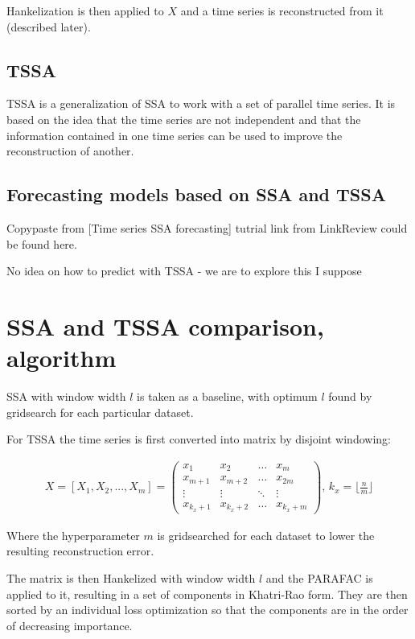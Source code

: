 \documentclass{article}
\begin{document}
Hankelization is then applied to \(X\) and a time series is reconstructed from it (described later).

\subsection{TSSA}

TSSA is a generalization of SSA to work with a set of parallel time series. It is based on the idea that the time series are not independent and that the information contained in one time series can be used to improve the reconstruction of another.

\subsection{Forecasting models based on SSA and TSSA}

Copypaste from [Time series SSA forecasting] tutrial link from LinkReview could be found here.

No idea on how to predict with TSSA - we are to explore this I suppose

\section{SSA and TSSA comparison, algorithm}

SSA with window width \(l\) is taken as a baseline, with optimum \(l\) found by gridsearch for each particular dataset.

For TSSA the time series is first converted into matrix by disjoint windowing:

\begin{gather}
X = [X_1, X_2, ..., X_{m}] =
 \begin{pmatrix}
	x_{1} & x_{2} & \dots & x_{m} \\
	x_{m+1} & x_{m+2} & \dots & x_{2m} \\
	\vdots & \vdots & \ddots & \vdots \\
	x_{k_{x}+1} & x_{k_x + 2} &  \dots & x_{k_x + m}
\end{pmatrix} \text{, }
k_x = \lfloor \frac{n}{m} \rfloor
\end{gather}

Where the hyperparameter \(m\) is gridsearched for each dataset to lower the resulting reconstruction error.

The matrix is then Hankelized with window width \(l\) and the PARAFAC is applied to it, resulting in a set of components in Khatri-Rao form. They are then sorted by an individual loss optimization so that the components are in the order of decreasing importance.
\end{document}
